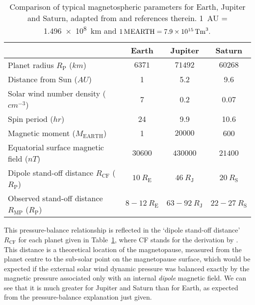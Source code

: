\begin{table}
\caption[Comparison of typical magnetospheric parameters for Earth, Jupiter and Saturn.]{Comparison of typical magnetospheric parameters for Earth, Jupiter and Saturn, adapted from \citet{bagenal2014} and references therein. \SI{1}{AU} = \SI{1.496e8}{km} and $\SI{1}{M_\mathrm{EARTH}} = \SI{7.9D15}{\tesla \m^3}.$}\label{intro:table:magnetospherecomparison}
\centering
\begin{tabular}{l c c c}
\hline
 																															& Earth						& Jupiter			& Saturn  \\
\hline
Planet radius $R_\mathrm{P}$ ($\si{km}$)															& $\num{6371}$										&	$\num{71492}$			&	$\num{60268}$ \\
Distance from Sun ($\si{AU}$)																			&	1							&	5.2						& 9.6		\\
Solar wind number density ($\si{cm^{-3}}$)														& 7							&	0.2						&	0.07		\\
Spin period ($\si{hr}$)																						&	24						& 	9.9						&10.6		\\
Magnetic moment ($\si{M_\mathrm{EARTH}}$)													&	1							&	$\num{20000}$	&	600		\\
Equatorial surface magnetic field ($\si{nT}$)														&	$\num{30600}$					&	$\num{430000}$		&	$\num{21400}	$\\
Dipole stand-off distance $R_\mathrm{CF}$	($\si{R_\mathrm{P}}$) 				&	$\SI{10}{R_\mathrm{E}}$ & $\SI{46}{R_\mathrm{J}}$ & $\SI{20}{R_\mathrm{S}}$ \\
Observed stand-off distance $R_\mathrm{MP}$ ($\si{R_\mathrm{P}}$)			&	$8-\SI{12}{R_\mathrm{E}}$ & $63-\SI{92}{R_\mathrm{J}}$ & $22-\SI{27}{R_\mathrm{S}}$ \\
\hline
\end{tabular}
\end{table}

This pressure-balance relationship is reflected in the `dipole stand-off distance' $R_\mathrm{CF}$ for each planet given in Table~\ref{intro:table:magnetospherecomparison}, where CF stands for the derivation by \citet{chapman1930}. This distance is a theoretical location of the magnetopause, measured from the planet centre to the sub-solar point on the magnetopause surface, which would be expected if the external solar wind dynamic pressure was balanced exactly by the magnetic pressure associated only with an internal \textit{dipole} magnetic field. We can see that it is much greater for Jupiter and Saturn than for Earth, as expected from the pressure-balance explanation just given.

